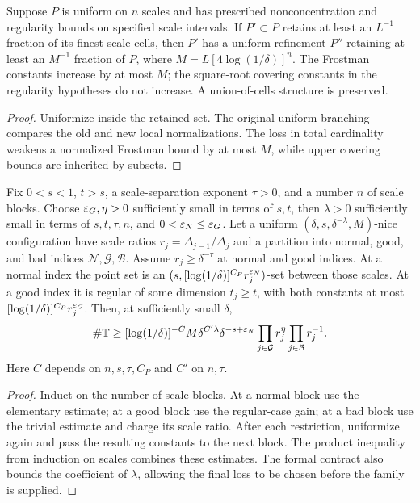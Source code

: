 \begin{lemma}
\label{lem:os-reuniformization}
Suppose $P$ is uniform on $n$ scales and has prescribed
nonconcentration and regularity bounds on specified scale intervals.
If $P'\subset P$ retains at least an $L^{-1}$ fraction of its
finest-scale cells, then $P'$ has a uniform refinement $P''$
retaining at least an $M^{-1}$ fraction of $P$, where
$M=L[4\log(1/\delta)]^n$. The Frostman constants increase by at
most $M$; the square-root covering constants in the regularity
hypotheses do not increase. A union-of-cells structure is preserved.
\end{lemma}
\begin{proof}
Uniformize inside the retained set. The original uniform branching
compares the old and new local normalizations. The loss in total
cardinality weakens a normalized Frostman bound by at most $M$,
while upper covering bounds are inherited by subsets.
\end{proof}

\begin{proposition}
\label{prop:os-combining}
Fix $0<s<1$, $t>s$, a scale-separation exponent $\tau>0$, and
a number $n$ of scale blocks. Choose $\varepsilon_G,\eta>0$ sufficiently
small in terms of $s,t$, then $\lambda>0$ sufficiently small in
terms of $s,t,\tau,n$, and $0<\varepsilon_N\leq\varepsilon_G$.
Let a uniform $(\delta,s,\delta^{-\lambda},M)$-nice configuration
have scale ratios $r_j=\Delta_{j-1}/\Delta_j$ and a partition into
normal, good, and bad indices $\mathcal N,\mathcal G,\mathcal B$.
Assume $r_j\geq\delta^{-\tau}$ at normal and good indices.
At a normal index the point set is an
$(s,[\log(1/\delta)]^{C_P}r_j^{\varepsilon_N})$-set between those
scales. At a good index it is regular of some dimension $t_j\geq t$,
with both constants at most
$[\log(1/\delta)]^{C_P}r_j^{\varepsilon_G}$.
Then, at sufficiently small $\delta$,
\[
 \#\mathbb{T}\geq[\log(1/\delta)]^{-C}
       M\delta^{C'\lambda}\delta^{-s+\varepsilon_N}
       \prod_{j\in\mathcal G}r_j^\eta
       \prod_{j\in\mathcal B}r_j^{-1}.
\]
Here $C$ depends on $n,s,\tau,C_P$ and $C'$ on $n,\tau$.
\end{proposition}
\begin{proof}
Induct on the number of scale blocks. At a normal block use the
elementary estimate; at a good block use the regular-case gain;
at a bad block use the trivial estimate and charge its scale ratio.
After each restriction, uniformize again and pass the resulting
constants to the next block. The product inequality from induction
on scales combines these estimates. The formal contract also
bounds the coefficient of $\lambda$, allowing the final loss to be
chosen before the family is supplied.
\end{proof}

